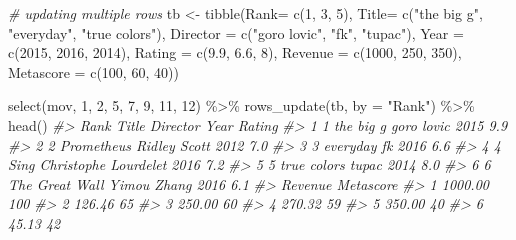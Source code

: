 \documentclass[
]{book}
\newenvironment{Shaded}{\begin{snugshade}}{\end{snugshade}}
\newcommand{\AttributeTok}[1]{\textcolor[rgb]{0.77,0.63,0.00}{#1}}
\newcommand{\CommentTok}[1]{\textcolor[rgb]{0.56,0.35,0.01}{\textit{#1}}}
\newcommand{\DecValTok}[1]{\textcolor[rgb]{0.00,0.00,0.81}{#1}}
\newcommand{\FloatTok}[1]{\textcolor[rgb]{0.00,0.00,0.81}{#1}}
\newcommand{\FunctionTok}[1]{\textcolor[rgb]{0.00,0.00,0.00}{#1}}
\newcommand{\NormalTok}[1]{#1}
\newcommand{\OtherTok}[1]{\textcolor[rgb]{0.56,0.35,0.01}{#1}}
\newcommand{\SpecialCharTok}[1]{\textcolor[rgb]{0.00,0.00,0.00}{#1}}
\newcommand{\StringTok}[1]{\textcolor[rgb]{0.31,0.60,0.02}{#1}}
\begin{document}
\begin{Shaded}
\begin{Highlighting}[]
\CommentTok{\# updating multiple rows}
\NormalTok{tb }\OtherTok{\textless{}{-}} 
  \FunctionTok{tibble}\NormalTok{(}\AttributeTok{Rank=} \FunctionTok{c}\NormalTok{(}\DecValTok{1}\NormalTok{, }\DecValTok{3}\NormalTok{, }\DecValTok{5}\NormalTok{),}
         \AttributeTok{Title=} \FunctionTok{c}\NormalTok{(}\StringTok{"the big g"}\NormalTok{, }\StringTok{"everyday"}\NormalTok{, }\StringTok{"true colors"}\NormalTok{), }
         \AttributeTok{Director =} \FunctionTok{c}\NormalTok{(}\StringTok{"goro lovic"}\NormalTok{, }\StringTok{"fk"}\NormalTok{, }\StringTok{"tupac"}\NormalTok{), }
         \AttributeTok{Year =} \FunctionTok{c}\NormalTok{(}\DecValTok{2015}\NormalTok{, }\DecValTok{2016}\NormalTok{, }\DecValTok{2014}\NormalTok{), }
         \AttributeTok{Rating =} \FunctionTok{c}\NormalTok{(}\FloatTok{9.9}\NormalTok{, }\FloatTok{6.6}\NormalTok{, }\DecValTok{8}\NormalTok{), }
         \AttributeTok{Revenue =} \FunctionTok{c}\NormalTok{(}\DecValTok{1000}\NormalTok{, }\DecValTok{250}\NormalTok{, }\DecValTok{350}\NormalTok{), }
         \AttributeTok{Metascore =} \FunctionTok{c}\NormalTok{(}\DecValTok{100}\NormalTok{, }\DecValTok{60}\NormalTok{, }\DecValTok{40}\NormalTok{))}

\FunctionTok{select}\NormalTok{(mov, }\DecValTok{1}\NormalTok{, }\DecValTok{2}\NormalTok{, }\DecValTok{5}\NormalTok{, }\DecValTok{7}\NormalTok{, }\DecValTok{9}\NormalTok{, }\DecValTok{11}\NormalTok{, }\DecValTok{12}\NormalTok{) }\SpecialCharTok{\%\textgreater{}\%}
  \FunctionTok{rows\_update}\NormalTok{(tb, }\AttributeTok{by =} \StringTok{"Rank"}\NormalTok{) }\SpecialCharTok{\%\textgreater{}\%}
  \FunctionTok{head}\NormalTok{()}
\CommentTok{\#\textgreater{}   Rank          Title             Director Year Rating}
\CommentTok{\#\textgreater{} 1    1      the big g           goro lovic 2015    9.9}
\CommentTok{\#\textgreater{} 2    2     Prometheus         Ridley Scott 2012    7.0}
\CommentTok{\#\textgreater{} 3    3       everyday                   fk 2016    6.6}
\CommentTok{\#\textgreater{} 4    4           Sing Christophe Lourdelet 2016    7.2}
\CommentTok{\#\textgreater{} 5    5    true colors                tupac 2014    8.0}
\CommentTok{\#\textgreater{} 6    6 The Great Wall          Yimou Zhang 2016    6.1}
\CommentTok{\#\textgreater{}   Revenue Metascore}
\CommentTok{\#\textgreater{} 1 1000.00       100}
\CommentTok{\#\textgreater{} 2  126.46        65}
\CommentTok{\#\textgreater{} 3  250.00        60}
\CommentTok{\#\textgreater{} 4  270.32        59}
\CommentTok{\#\textgreater{} 5  350.00        40}
\CommentTok{\#\textgreater{} 6   45.13        42}


\end{Highlighting}
\end{Shaded}
\end{document}
